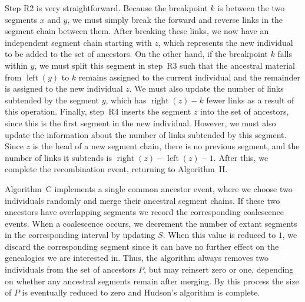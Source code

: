 \documentclass[10pt]{article}
\newcommand{\algref}[1]{#1}
\DeclareMathOperator{\segright}{right}
\DeclareMathOperator{\segleft}{left}
\begin{document}
Step \algref{R2} is very straightforward. Because the breakpoint $k$ is between
the two segments $x$ and $y$, we must simply break the forward and reverse
links in the segment chain between them. After breaking these links, we now
have an independent segment chain starting with $z$, which
represents the new individual to be added to the set of ancestors. On the other
hand, if the breakpoint $k$ falls within $y$, we must
split this segment in step~\algref{R3} such that the ancestral material
from $\segleft(y)$ to $k$ remains
assigned to the current individual and the remainder is assigned to the
new individual $z$. We must also update the number of links subtended by the
segment $y$, which has $\segright(z) - k$ fewer links as a result of this operation.
Finally, step~\algref{R4} inserts the segment $z$ into the set of ancestors,
since this is the first segment in the new individual. However, we must also
update the information about the number of links subtended by this segment.
Since $z$ is the head of a new segment chain, there is no previous segment, and
the number of links it subtends is $\segright(z) - \segleft(z) - 1$.
After this, we complete the recombination event, returning to
Algorithm~\algref{H}.

Algorithm~\algref{C} implements a single common ancestor event, where we choose
two individuals randomly and merge their ancestral segment chains. If these two
ancestors have overlapping segments we record the corresponding coalescence
events. When a coalescence  occurs, we decrement the number of extant segments
in the corresponding interval by updating $S$. When this value is reduced to
$1$, we discard the corresponding segment since it can have no further effect
on the genealogies we are interested in. Thus, the algorithm always removes two
individuals from the set of ancestors $P$, but may reinsert zero or one,
depending on whether any ancestral segments remain after merging. By this
process the size of $P$ is eventually reduced to zero and Hudson's algorithm is
complete.
\end{document}
